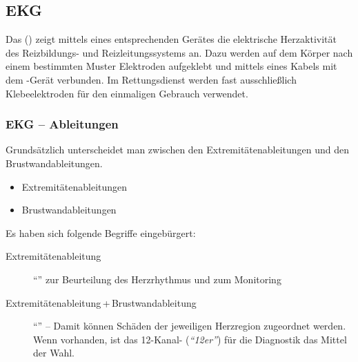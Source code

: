 \subsection{EKG}
\label{topic:ekg}

Das  () zeigt mittels eines
entsprechenden Gerätes die elektrische Herzaktivität des
Reizbildungs- und Reizleitungssystems an. Dazu werden auf
dem Körper nach einem bestimmten Muster Elektroden
aufgeklebt und mittels eines Kabels mit dem -Gerät
verbunden. Im Rettungsdienst werden fast ausschließlich
Klebeelektroden für den einmaligen Gebrauch verwendet. 

 



\subsubsection{EKG -- Ableitungen}
\label{topic:ekg-ableitungen}
Grundsätzlich unterscheidet man zwischen den Extremitätenableitungen
und den Brustwandableitungen. 

\begin{itemize}
    \item Extremitätenableitungen
    \item Brustwandableitungen
\end{itemize}

Es haben sich folgende Begriffe eingebürgert:

\begin{description}
    \item[Extremitätenableitung] "`"'
    zur Beurteilung des Herzrhythmus und zum Monitoring
    \item[Extremitätenableitung\,+\,Brustwandableitung]
    "`"' -- Damit können Schäden der
    jeweiligen Herzregion zugeordnet werden. Wenn vorhanden,
    ist das 12-Kanal- (\emph{"`12er"'}) für die
    Diagnostik das Mittel der Wahl. 
\end{description}

